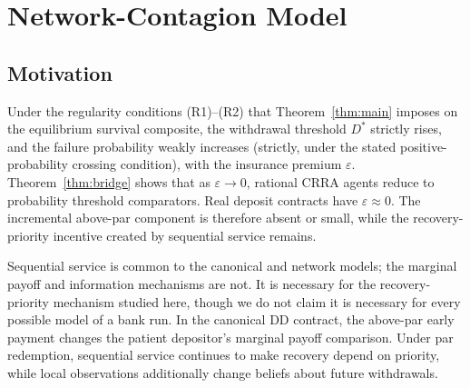 \documentclass[12pt]{article}\usepackage[]{graphicx}\usepackage[]{xcolor}
\begin{document}
\section{Network-Contagion Model}
\label{sec:replacement}

\subsection{Motivation}

Under the regularity conditions (R1)--(R2) that Theorem~\ref{thm:main} imposes on the equilibrium survival composite, the withdrawal threshold $D^*$ strictly rises, and the failure probability weakly increases (strictly, under the stated positive-probability crossing condition), with the insurance premium $\varepsilon$.
Theorem~\ref{thm:bridge} shows that as $\varepsilon \to 0$, rational CRRA agents reduce to probability threshold comparators.
Real deposit contracts have $\varepsilon \approx 0$.
The incremental above-par component is therefore absent or small, while the recovery-priority incentive created by sequential service remains.

Sequential service is common to the canonical and network models; the marginal payoff and information mechanisms are not.
It is necessary for the recovery-priority mechanism studied here, though we do not claim it is necessary for every possible model of a bank run.
In the canonical DD contract, the above-par early payment changes the patient depositor's marginal payoff comparison.
Under par redemption, sequential service continues to make recovery depend on priority, while local observations additionally change beliefs about future withdrawals.
\end{document}
